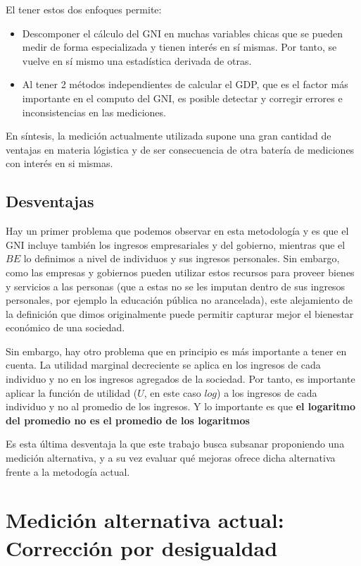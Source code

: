 El tener estos dos enfoques permite:

\begin{itemize}
    \item Descomponer el cálculo del GNI en muchas variables chicas que se pueden medir de forma especializada y tienen interés en sí mismas. Por tanto, se vuelve en sí mismo una estadística derivada de otras.
    \item Al tener 2 métodos independientes de calcular el GDP, que es el factor más importante en el computo del GNI, es posible detectar y corregir errores e inconsistencias en las mediciones.
\end{itemize}

En síntesis, la medición actualmente utilizada supone una gran cantidad de ventajas en materia lógistica y de ser consecuencia de otra batería de mediciones con interés en si mismas.

\subsection{Desventajas}

Hay un primer problema que podemos observar en esta metodología y es que el GNI incluye también los ingresos empresariales y del gobierno, mientras que el $BE$ lo definimos a nivel de individuos y sus ingresos personales. Sin embargo, como las empresas y gobiernos pueden utilizar estos recursos para proveer bienes y servicios a las personas (que a estas no se les imputan dentro de sus ingresos personales, por ejemplo la educación pública no arancelada), este alejamiento de la definición que dimos originalmente puede permitir capturar mejor el bienestar económico de una sociedad. 

Sin embargo, hay otro problema que en principio es más importante a tener en cuenta. La utilidad marginal decreciente se aplica en los ingresos de cada individuo y no en los ingresos agregados de la sociedad. Por tanto, es importante aplicar la función de utilidad ($U$, en este caso $log$) a los ingresos de cada individuo y no al promedio de los ingresos. Y lo importante es que \textbf{el logaritmo del promedio no es el promedio de los logaritmos}

Es esta última desventaja la que este trabajo busca subsanar proponiendo una medición alternativa, y a su vez evaluar qué mejoras ofrece dicha alternativa frente a la metodogía actual.

\section{Medición alternativa actual: Corrección por desigualdad}

